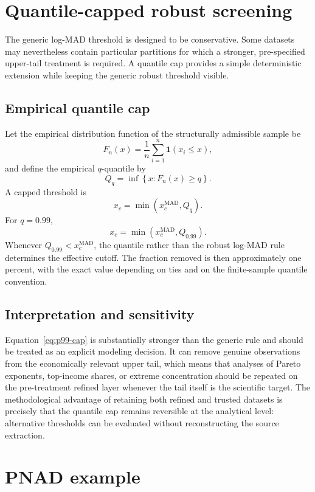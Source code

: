 \documentclass[12pt]{article}
\newcommand{\be}{\begin{equation}}
\newcommand{\ee}{\end{equation}}
\numberwithin{equation}{section}
\begin{document}
\section{Quantile-capped robust screening}

The generic log-MAD threshold is designed to be conservative. Some datasets may nevertheless contain particular partitions for which a stronger, pre-specified upper-tail treatment is required. A quantile cap provides a simple deterministic extension while keeping the generic robust threshold visible.

\subsection{Empirical quantile cap}

Let the empirical distribution function of the structurally admissible sample be
\be
F_n(x)
=
\frac{1}{n}
\sum_{i=1}^{n}
\mathbf{1}(x_i\leq x),
\label{eq:empirical-cdf}
\ee
and define the empirical $q$-quantile by
\be
Q_q
=
\inf\left\{x:F_n(x)\geq q\right\}.
\label{eq:empirical-quantile}
\ee
A capped threshold is
\be
x_c
=
\min\left(x_c^{\mathrm{MAD}},Q_q\right).
\label{eq:quantile-cap}
\ee
For $q=0.99$,
\be
x_c
=
\min\left(x_c^{\mathrm{MAD}},Q_{0.99}\right).
\label{eq:p99-cap}
\ee
Whenever $Q_{0.99}<x_c^{\mathrm{MAD}}$, the quantile rather than the robust log-MAD rule determines the effective cutoff. The fraction removed is then approximately one percent, with the exact value depending on ties and on the finite-sample quantile convention.

\subsection{Interpretation and sensitivity}

Equation~\eqref{eq:p99-cap} is substantially stronger than the generic rule and should be treated as an explicit modeling decision. It can remove genuine observations from the economically relevant upper tail, which means that analyses of Pareto exponents, top-income shares, or extreme concentration should be repeated on the pre-treatment refined layer whenever the tail itself is the scientific target. The methodological advantage of retaining both refined and trusted datasets is precisely that the quantile cap remains reversible at the analytical level: alternative thresholds can be evaluated without reconstructing the source extraction.

\section{PNAD example}
\end{document}
